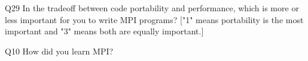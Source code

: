 \begin{description}%
\item{Q29} In the tradeoff between code portability and performance, which is more or less important for you to write MPI programs? ["1" means portability is the most important and "3" means both are equally important.]%
\item{Q10} How did you learn MPI?%
\end{description}%
